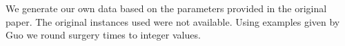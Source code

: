 We generate our own data based on the parameters provided in the original paper. The original instances used were not available. Using examples given by Guo\cite{guo} we round surgery times to integer values.